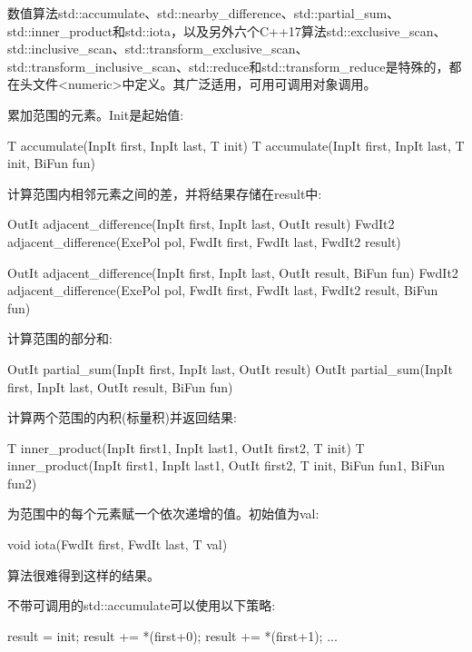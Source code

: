 数值算法std::accumulate、std::nearby\_difference、std::partial\_sum、std::inner\_product和std::iota，以及另外六个C++17算法std::exclusive\_scan、std::inclusive\_scan、std::transform\_exclusive\_scan、std::transform\_inclusive\_scan、std::reduce和std::transform\_reduce是特殊的，都在头文件<numeric>中定义。其广泛适用，可用可调用对象调用。

累加范围的元素。Init是起始值:

\begin{cpp}
T accumulate(InpIt first, InpIt last, T init)
T accumulate(InpIt first, InpIt last, T init, BiFun fun)
\end{cpp}

计算范围内相邻元素之间的差，并将结果存储在result中:

\begin{cpp}
OutIt adjacent_difference(InpIt first, InpIt last, OutIt result)
FwdIt2 adjacent_difference(ExePol pol, FwdIt first, FwdIt last, FwdIt2 result)

OutIt adjacent_difference(InpIt first, InpIt last, OutIt result, BiFun fun)
FwdIt2 adjacent_difference(ExePol pol, FwdIt first, FwdIt last,
						   FwdIt2 result, BiFun fun)
\end{cpp}

计算范围的部分和:

\begin{cpp}
OutIt partial_sum(InpIt first, InpIt last, OutIt result)
OutIt partial_sum(InpIt first, InpIt last, OutIt result, BiFun fun)
\end{cpp}

计算两个范围的内积(标量积)并返回结果:

\begin{cpp}
T inner_product(InpIt first1, InpIt last1, OutIt first2, T init)
T inner_product(InpIt first1, InpIt last1, OutIt first2, T init,
				BiFun fun1, BiFun fun2)
\end{cpp}

为范围中的每个元素赋一个依次递增的值。初始值为val:

\begin{cpp}
void iota(FwdIt first, FwdIt last, T val)
\end{cpp}

算法很难得到这样的结果。

不带可调用的std::accumulate可以使用以下策略:

\begin{cpp}
result = init;
result += *(first+0);
result += *(first+1);
...
\end{cpp}

